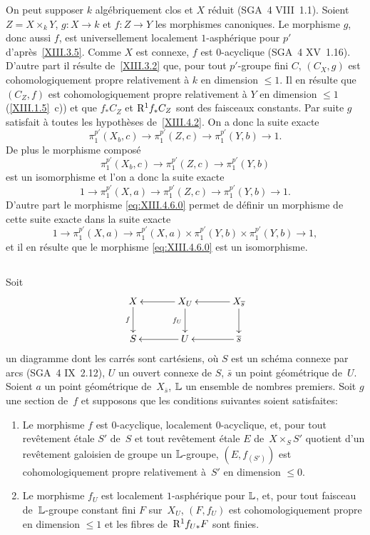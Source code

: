 On peut supposer $k$ alg\'ebriquement clos et $X$ r\'eduit
(SGA~4 VIII~1.1). Soient $Z=X\times_k Y$, $g\colon X\to k$ et $f\colon
Z\to Y$ les morphismes canoniques. Le morphisme $g$, donc aussi $f$,
est universellement localement $1$-asph\'erique pour $p'$
d'apr\`es~\ref{XIII.3.5}. Comme $X$ est connexe, $f$ est
$0$-acyclique (SGA~4 XV~1.16). D'autre part il r\'esulte
de~\ref{XIII.3.2} que, pour tout $p'$-groupe fini $C$, $(C_X,g)$ est
cohomologiquement propre relativement \`a $k$ en dimension $\leq
1$. Il en r\'esulte que $(C_Z,f)$ est cohomologiquement propre
relativement \`a $Y$ en dimension $\leq 1$ (\ref{XIII.1.5}~c)) et
que $f_*C_Z$ et $\mathrm{R}^1f_*C_Z$ sont des faisceaux constants. Par suite
$g$ satisfait \`a toutes les hypoth\`eses de~\ref{XIII.4.2}. On a
donc la suite exacte
$$
\pi_1^{p'}(X_b,c)\to\pi_1^{p'}(Z,c)\to\pi_1^{p'}(Y,b)\to 1.
$$
De plus le morphisme compos\'e
$$
\pi_1^{p'}(X_b,c)\to\pi_1^{p'}(Z,c)\to\pi_1^{p'}(Y,b)
$$
est un isomorphisme et l'on a donc la suite exacte
$$
1\to\pi_1^{p'}(X,a)\to\pi_1^{p'}(Z,c)\to\pi_1^{p'}(Y,b)\to 1.
$$
D'autre part le morphisme \eqref{eq:XIII.4.6.0} permet de d\'efinir
un morphisme de cette suite exacte dans la suite exacte
$$
1\to\pi_1^{p'}(X,a)\to
\pi_1^{p'}(X,a)\times\pi_1^{p'}(Y,b)\times\pi_1^{p'}(Y,b)\to 1,
$$
et il en r\'esulte que le morphisme \eqref{eq:XIII.4.6.0} est un
isomorphisme.

\subsection{}
\label{XIII.4.7} Soit
$$
\xymatrix@C=1.2cm{{X}\ar[d]_-f&{X_U}\ar[l]\ar[d]_-{f_U}&{X_{\bar{s}}}\ar[l]\ar[d]\\{S}&{U}\ar[l]&{\bar{s}}\ar[l]}
$$
un
diagramme dont les carr\'es sont cart\'esiens, o\`u $S$ est un
sch\'ema connexe par arcs (SGA~4 IX~2.12), $U$ un ouvert connexe de
$S$, $\bar{s}$ un point g\'eom\'etrique de~$U$. Soient $a$ un
point g\'eom\'etrique de~$X_{\bar{s}}$, $\mathbb{L}$ un ensemble de
nombres premiers. Soit $g$ une section de~$f$ et supposons que les
conditions suivantes soient satisfaites:
\begin{enumerate}
\item[a)] Le morphisme $f$ est $0$-acyclique, localement $0$-acyclique,
et, pour tout rev\^etement \'etale $S'$ de~$S$ et tout
rev\^etement \'etale $E$ de~$X\times_S S'$ quotient d'un
rev\^etement galoisien de groupe un $\mathbb{L}$-groupe, $(E,f_{(S')})$ est
cohomologiquement propre relativement \`a~$S'$ en dimension $\leq
0$.
\item[b)] Le morphisme $f_U$ est localement $1$-asph\'erique pour
$\mathbb{L}$, et, pour tout faisceau de~$\mathbb{L}$-groupe constant fini $F$ sur~$X_U$, $(F,f_U)$ est cohomologiquement propre en dimension $\leq 1$ et
les fibres de~$\mathrm{R}^1 f_{U*}F$ sont finies.
\end{enumerate}

